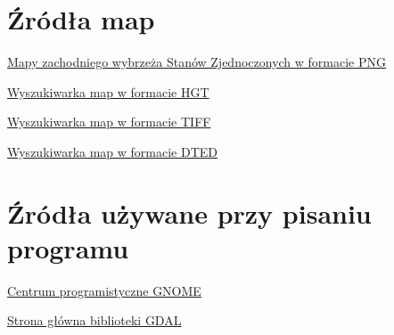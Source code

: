 \documentclass[a4paper]{article}
\begin{document}
\section{Źródła map}
\href{www.cc.gatech.edu/projects/large_models/ps.html}{Mapy zachodniego wybrzeża Stanów Zjednoczonych w formacie PNG}

\href{http://www.viewfinderpanoramas.org/Coverage\%20map\%20viewfinderpanoramas_org3.htm}{Wyszukiwarka map w formacie HGT }

\href{http://srtm.csi.cgiar.org/SELECTION/inputCoord.asp}{Wyszukiwarka map w formacie TIFF}

\href{http://data.geocomm.com/catalog/index.html}{Wyszukiwarka map w formacie DTED}

\section{Źródła używane przy pisaniu programu}

\href{https://developer.gnome.org/}{Centrum programistyczne GNOME}

\href{www.gdal.org}{Strona główna biblioteki GDAL}
\end{document}

